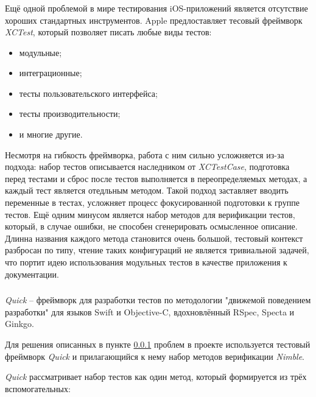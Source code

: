 \subsubsection{}
\label{sec:testing:tech:xctest}

Ещё одной проблемой в мире тестирования iOS-приложений является отсутствие хороших стандартных инструментов. Apple предлоставляет тесовый фреймворк \textit{XCTest}, который позволяет писать любые виды тестов:

\begin{itemize}
	\item модульные;
	\item интеграционные;
	\item тесты пользовательского интерфейса;
	\item тесты производительности;
	\item и многие другие.
\end{itemize}

Несмотря на гибкость фреймворка, работа с ним сильно усложняется из-за подхода: набор тестов описывается наследником от \textit{XCTestCase}, подготовка перед тестами и сброс после тестов выполняется в переопределяемых методах, а каждый тест является отедльным методом. Такой подход заставляет вводить переменные в тестах, усложняет процесс фокусированной подготовки к группе тестов. Ещё одним минусом является набор методов для верификации тестов, который, в случае ошибки, не способен сгенерировать осмысленное описание. Длинна названия каждого метода становится очень большой, тестовый контекст разбросан по типу, чтение таких конфигураций не является тривиальной задачей, что портит идею использования модульных тестов в качестве приложения к документации.

\subsubsection{}
\label{sec:testing:tech:quick}
\textit{Quick} -- фреймворк для разработки тестов по методологии "движемой поведением разработки" для языков Swift и Objective-C, вдохновлённый RSpec, Specta и Ginkgo\cite{github:quick}.

Для решения описанных в пункте \ref{sec:testing:tech:xctest} проблем в проекте используется тестовый фреймворк \textit{Quick} и прилагающийся к нему набор методов верификации \textit{Nimble}.

\textit{Quick} рассматривает набор тестов как один метод, который формируется из трёх вспомогательных:

